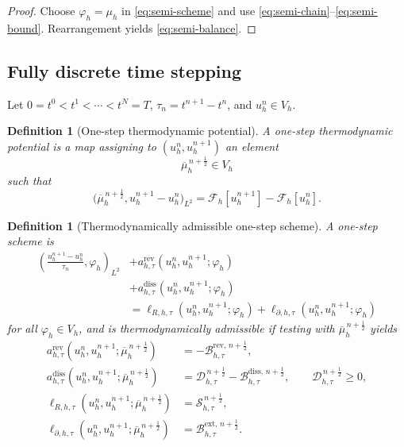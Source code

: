 \documentclass[11pt]{article}
\newtheorem{definition}[theorem]{Definition}
\newcommand{\F}{\mathcal{F}}
\newcommand{\Diss}{\mathcal{D}}
\newcommand{\Bnd}{\mathcal{B}}
\newcommand{\Src}{\mathcal{S}}
\begin{document}
\begin{proof}
Choose \(\varphi_h=\mu_h\) in \eqref{eq:semi-scheme} and use
\eqref{eq:semi-chain}--\eqref{eq:semi-bound}. Rearrangement yields
\eqref{eq:semi-balance}.
\end{proof}

\subsection{Fully discrete time stepping}

Let \(0=t^0<t^1<\cdots<t^N=T\), \(\tau_n=t^{n+1}-t^n\), and \(u_h^n\in V_h\).

\begin{definition}[One-step thermodynamic potential]
A \emph{one-step thermodynamic potential} is a map assigning to
\((u_h^n,u_h^{n+1})\) an element
\[
\overline{\mu}_h^{\,n+\frac12}\in V_h
\]
such that
\begin{equation}\label{eq:fd-chain}
\bigl(\overline{\mu}_h^{\,n+\frac12},u_h^{n+1}-u_h^n\bigr)_{L^2}
=
\F_h[u_h^{n+1}]-\F_h[u_h^n].
\end{equation}
\end{definition}

\begin{definition}[Thermodynamically admissible one-step scheme]
A one-step scheme is
\begin{equation}\label{eq:fd-scheme}
\begin{aligned}
\left(\frac{u_h^{n+1}-u_h^n}{\tau_n},\varphi_h\right)_{L^2}
&+
a_{h,\tau}^{\mathrm{rev}}(u_h^n,u_h^{n+1};\varphi_h)\\
&+
a_{h,\tau}^{\mathrm{diss}}(u_h^n,u_h^{n+1};\varphi_h)\\
&=
\ell_{R,h,\tau}(u_h^n,u_h^{n+1};\varphi_h)
+
\ell_{\partial,h,\tau}(u_h^n,u_h^{n+1};\varphi_h)
\end{aligned}
\end{equation}
for all \(\varphi_h\in V_h\), and is \emph{thermodynamically admissible} if testing
with \(\overline{\mu}_h^{\,n+\frac12}\) yields
\begin{align}
a_{h,\tau}^{\mathrm{rev}}(u_h^n,u_h^{n+1};\overline{\mu}_h^{\,n+\frac12})
&=
-\Bnd_{h,\tau}^{\mathrm{rev},\,n+\frac12},\label{eq:fd-rev}\\
a_{h,\tau}^{\mathrm{diss}}(u_h^n,u_h^{n+1};\overline{\mu}_h^{\,n+\frac12})
&=
\Diss_{h,\tau}^{\,n+\frac12}
-\Bnd_{h,\tau}^{\mathrm{diss},\,n+\frac12},
\qquad
\Diss_{h,\tau}^{\,n+\frac12}\ge 0,\label{eq:fd-diss}\\
\ell_{R,h,\tau}(u_h^n,u_h^{n+1};\overline{\mu}_h^{\,n+\frac12})
&=
\Src_{h,\tau}^{\,n+\frac12},\label{eq:fd-source}\\
\ell_{\partial,h,\tau}(u_h^n,u_h^{n+1};\overline{\mu}_h^{\,n+\frac12})
&=
\Bnd_{h,\tau}^{\mathrm{ext},\,n+\frac12}.\label{eq:fd-bound}
\end{align}
\end{definition}
\end{document}
